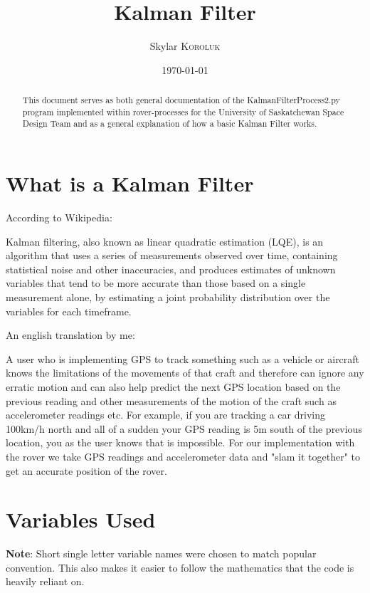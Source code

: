 \documentclass{article}
\title{Kalman Filter} %
\author{Skylar \textsc{Koroluk}} %
\date{\today} %
\begin{document}
\maketitle %

\begin{abstract}
This document serves as both general documentation of the KalmanFilterProcess2.py program implemented within rover-processes for the University of Saskatchewan Space Design Team and as a general explanation of how a basic Kalman Filter works.
\end{abstract}

\tableofcontents

\section{What is a Kalman Filter}
According to Wikipedia:\par
\begin{center}
Kalman filtering, also known as linear quadratic estimation (LQE), is an algorithm that uses a series of measurements observed over time, containing statistical noise and other inaccuracies, and produces estimates of unknown variables that tend to be more accurate than those based on a single measurement alone, by estimating a joint probability distribution over the variables for each timeframe. 
\end{center}
An english translation by me:\par
\begin{center}
A user who is implementing GPS to track something such as a vehicle or aircraft knows the limitations of the movements of that craft and therefore can ignore any erratic motion and can also help predict the next GPS location based on the previous reading and other measurements of the motion of the craft such as accelerometer readings etc. For example, if you are tracking a car driving 100km/h north and all of a sudden your GPS reading is 5m south of the previous location, you as the user knows that is impossible. For our implementation with the rover we take GPS readings and accelerometer data and "slam it together" to get an accurate position of the rover. 
\end{center}
\section{Variables Used}
\textbf{Note}: Short single letter variable names were chosen to match popular convention. This also makes it easier to follow the mathematics that the code is heavily reliant on. 
\end{document}

